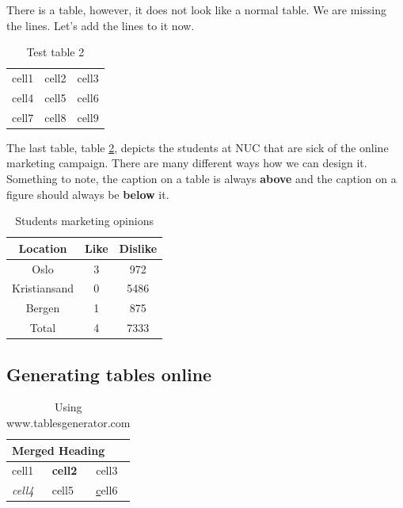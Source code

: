\documentclass[a4paper, 10pt, english]{extarticle}
\begin{document}
There is a table, however, it does not look like a normal table. We are missing the lines. Let's add the lines to it now.

\begin{table}[H]
    \centering
    \begin{tabular}{| c | c | c |}
    \hline
    cell1 & cell2 & cell3 \\
    cell4 & cell5 & cell6 \\
    cell7 & cell8 & cell9 \\
    \hline
    \end{tabular}
    \caption{Test table 2}
    \label{tab:test_table2}
\end{table}

\bigbreak

The last table, table \ref{tab:test_table3}, depicts the students at NUC that are sick of the online marketing campaign. There are many different ways how we can design it.
Something to note, the caption on a table is always \textbf{above} and the caption on a figure should always be \textbf{below} it.

\begin{table}[H]
    \centering
    \caption{Students marketing opinions}
    \begin{tabular}{|| c | c | c ||}
    \hline
    Location & Like & Dislike \\
    \hline
    \hline
    Oslo & 3 & 972 \\
    Kristiansand & 0 & 5486 \\
    Bergen & 1 & 875 \\
    \hline
    \hline
    Total & 4 & 7333 \\
    \hline
    \end{tabular}
    \label{tab:test_table3}
\end{table}

\subsection{Generating tables online}
\begin{table}[H]
    \centering
    \caption{Using www.tablesgenerator.com}
    \begin{tabular}{lll}
    \hline
    \multicolumn{3}{|l|}{Merged Heading} \\ \hline
    {\color[HTML]{96FFFB} cell1} & \textbf{cell2} & \cellcolor[HTML]{32CB00}cell3 \\
    \textit{cell4} & \cellcolor[HTML]{CE6301}cell5 & {\ul cell6}
    \end{tabular}
\end{table}
\end{document}

